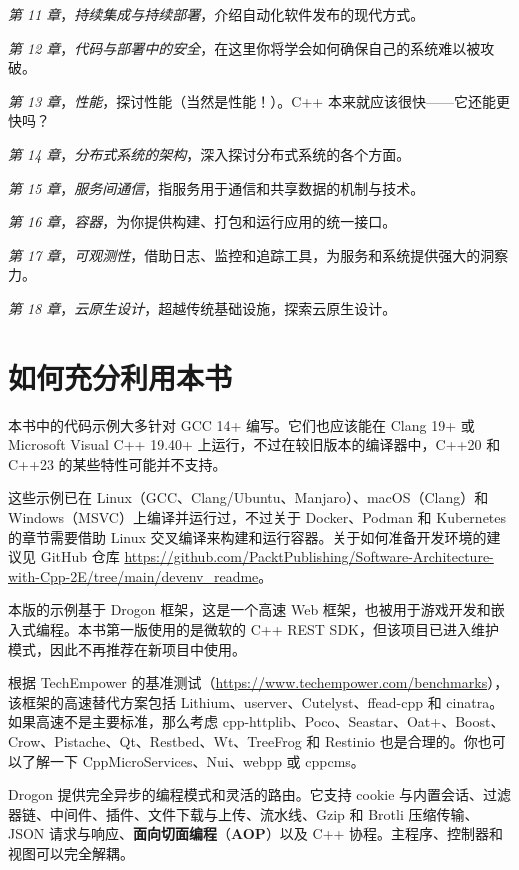 \emph{第 11 章}，\emph{持续集成与持续部署}，介绍自动化软件发布的现代方式。

\emph{第 12 章}，\emph{代码与部署中的安全}，在这里你将学会如何确保自己的系统难以被攻破。

\emph{第 13 章}，\emph{性能}，探讨性能（当然是性能！）。C++ 本来就应该很快——它还能更快吗？

\emph{第 14 章}，\emph{分布式系统的架构}，深入探讨分布式系统的各个方面。

\emph{第 15 章}，\emph{服务间通信}，指服务用于通信和共享数据的机制与技术。

\emph{第 16 章}，\emph{容器}，为你提供构建、打包和运行应用的统一接口。

\emph{第 17 章}，\emph{可观测性}，借助日志、监控和追踪工具，为服务和系统提供强大的洞察力。

\emph{第 18 章}，\emph{云原生设计}，超越传统基础设施，探索云原生设计。

\section*{如何充分利用本书}

本书中的代码示例大多针对 GCC 14+ 编写。它们也应该能在 Clang 19+ 或 Microsoft Visual C++ 19.40+ 上运行，不过在较旧版本的编译器中，C++20 和 C++23 的某些特性可能并不支持。

这些示例已在 Linux（GCC、Clang/Ubuntu、Manjaro）、macOS（Clang）和 Windows（MSVC）上编译并运行过，不过关于 Docker、Podman 和 Kubernetes 的章节需要借助 Linux 交叉编译来构建和运行容器。关于如何准备开发环境的建议见 GitHub 仓库 \href{https://github.com/PacktPublishing/Software-Architecture-with-Cpp-2E/tree/main/devenv_readme}{https://github.com/PacktPublishing/Software-Architecture-with-Cpp-2E/tree/main/devenv\_readme}。

本版的示例基于 Drogon 框架，这是一个高速 Web 框架，也被用于游戏开发和嵌入式编程。本书第一版使用的是微软的 C++ REST SDK，但该项目已进入维护模式，因此不再推荐在新项目中使用。

根据 TechEmpower 的基准测试（\href{https://www.techempower.com/benchmarks}{https://www.techempower.com/benchmarks}），该框架的高速替代方案包括 Lithium、userver、Cutelyst、ffead-cpp 和 cinatra。如果高速不是主要标准，那么考虑 cpp-httplib、Poco、Seastar、Oat+、Boost、Crow、Pistache、Qt、Restbed、Wt、TreeFrog 和 Restinio 也是合理的。你也可以了解一下 CppMicroServices、Nui、webpp 或 cppcms。

Drogon 提供完全异步的编程模式和灵活的路由。它支持 cookie 与内置会话、过滤器链、中间件、插件、文件下载与上传、流水线、Gzip 和 Brotli 压缩传输、JSON 请求与响应、\textbf{面向切面编程}（\textbf{AOP}）以及 C++ 协程。主程序、控制器和视图可以完全解耦。

